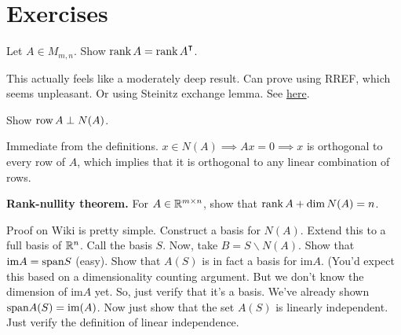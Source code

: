 

\section{Exercises}
\begin{exercise} \label{exer:rank-transpose-eqal}
  Let $A\in M_{m,n}$. Show $\myrank A = \myrank A^\T$.
\end{exercise}

\begin{solution}
  This actually feels like a moderately deep result. Can prove using RREF, which seems unpleasant. Or using Steinitz exchange lemma. See \href{https://en.wikipedia.org/wiki/Rank_(linear_algebra)#Proof_using_linear_combinations}{here}.
\end{solution}

\begin{exercise}
  Show $\text{row}\, A \perp N(A)$.
\end{exercise}

\begin{solution}
Immediate from the definitions. $x\in N(A) \implies Ax = 0 \implies x$ is orthogonal to every row of $A$, which implies that it is orthogonal to any linear combination of rows. 
\end{solution}
  
\begin{exercise}
\textbf{Rank-nullity theorem.} For $A\in \mathbb{R}^{m\times n}$, show that $\textup{rank}\, A + \dim N(A) = n$.
\end{exercise}

\begin{solution}
Proof on Wiki is pretty simple. Construct a basis for $N(A)$. Extend this to a full basis of $\mathbb{R}^n$. Call the basis $S$. Now, take $B = S\backslash N(A)$. Show that $\text{im} A = \textup{span} S$ (easy). Show that $A(S)$ is in fact a basis for $\text{im} A$. (You'd expect this based on a dimensionality counting argument. But we don't know the dimension of im$A$ yet. So, just verify that it's a basis. We've already shown $\textup{span} A(S) = \text{im}(A)$. Now just show that the set $A(S)$ is linearly independent. Just verify the definition of linear independence. 
\end{solution}

